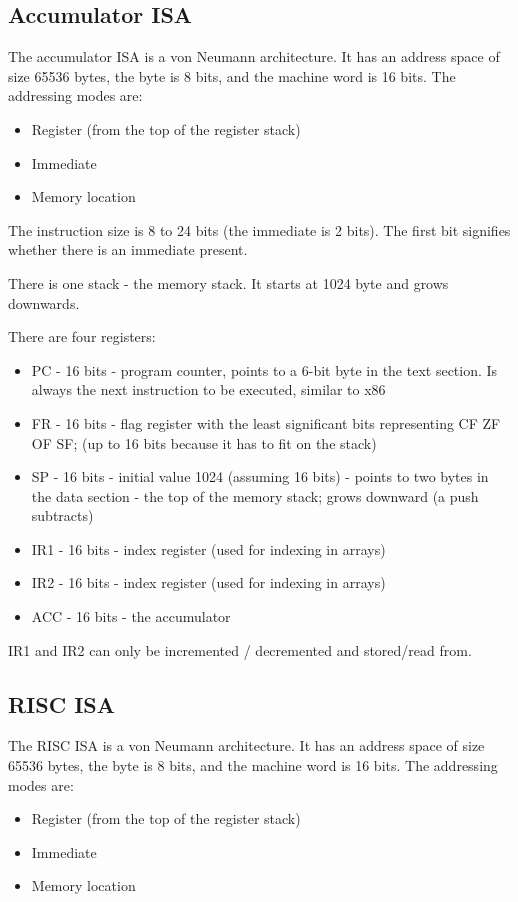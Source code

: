\documentclass[conference]{IEEEtran}
\begin{document}
\subsection {Accumulator ISA \cite{b6}}
The accumulator ISA is a von Neumann architecture.
It has an address space of size 65536 bytes, the byte is 8 bits,
and the machine word is 16 bits. The addressing modes are:
\begin{itemize}
	\item Register (from the top of the register stack)
	\item Immediate
	\item Memory location
\end{itemize}

The instruction size is 8 to 24 bits (the immediate is 2 bits). The first bit signifies whether there is an immediate present.

There is one stack - the memory stack. It starts at 1024 byte and grows downwards.

There are four registers:
\begin{itemize}
	\item PC - 16 bits - program counter, points to a 6-bit byte in the text section. Is always the next instruction to be executed, similar to x86
	\item FR - 16 bits - flag register with the least significant bits representing CF ZF OF SF; (up to 16 bits because it has to fit on the stack)
	\item SP - 16 bits - initial value 1024 (assuming 16 bits) - points to two bytes in the data section - the top of the memory stack; grows downward (a push subtracts)
	\item IR1 - 16 bits - index register (used for indexing in arrays)
	\item IR2 - 16 bits - index register (used for indexing in arrays)
	\item ACC - 16 bits - the accumulator
\end{itemize}

IR1 and IR2 can only be incremented / decremented and stored/read from.

\subsection {RISC ISA}
The RISC ISA is a von Neumann architecture.
It has an address space of size 65536 bytes, the byte is 8 bits,
and the machine word is 16 bits. The addressing modes are:
\begin{itemize}
	\item Register (from the top of the register stack)
	\item Immediate
	\item Memory location
\end{itemize}
\end{document}
